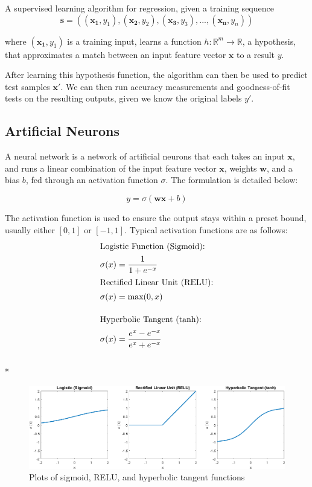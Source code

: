 \documentclass[12pt,a4paper,twoside,openright]{report}
\renewcommand{\vec}[1]{\mathbf{#1}}
\newcommand{\R}{\mathbb{R}}
\begin{document}
A supervised learning algorithm for regression, given a training sequence
\begin{equation}
\vec{s} = ((\vec{x_1}, y_1), (\vec{x_2}, y_2), (\vec{x_3}, y_3), ... , (\vec{x_n}, y_n))
\end{equation}

where $(\vec{x_1}, y_1)$ is a training input, learns a function $h: \R^m \rightarrow \R$,
a hypothesis, that approximates a match between an input feature vector $\vec{x}$ to a
result $y$.

After learning this hypothesis function, the algorithm can then be used to predict test
samples $\vec{x'}$. We can then run accuracy measurements and goodness-of-fit tests on
the resulting outputs, given we know the original labels $y'$.

\subsection{Artificial Neurons}
\label{sec:prepNeurons}

A neural network is a network of artificial neurons that each takes an input $\vec{x}$,
and runs a linear combination of the input feature vector $\vec{x}$, weights $\vec{w}$, and a bias $b$,
fed through an activation function $\sigma$. The formulation is detailed below:

\begin{equation}
y = \sigma (\vec{wx} + b)
\end{equation}

The activation function is used to ensure the output stays within a preset bound,
usually either $[0,1]$ or $[-1,1]$. Typical activation functions are as follows:
\begin{align}
\intertext{Logistic Function (Sigmoid):}
&\sigma(x) = \frac{1}{1+e^{-x}}\\
\intertext{Rectified Linear Unit (RELU):}
&\sigma(x) = \text{max}(0,x)\\[10pt]
\intertext{Hyperbolic Tangent (tanh):}
&\sigma(x) = \frac{e^x - e^{-x}}{e^x + e^{-x}}
\end{align}\\*

\begin{figure}[h]
\includegraphics[width=\textwidth]{ActivationFunsCrop.png}
\caption{Plots of sigmoid, RELU, and hyperbolic tangent functions}
\end{figure}
\end{document}
